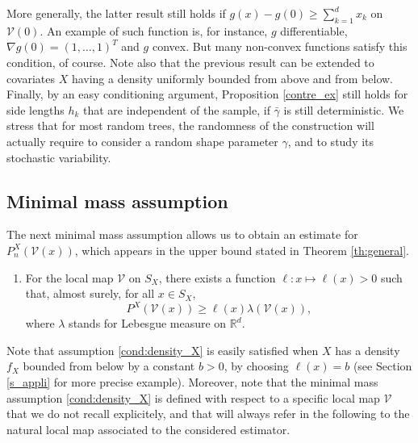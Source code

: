 \documentclass[paper=a4, fontsize=11pt]{scrartcl}
\newcommand{\diam}{\operatorname{diam}}
\begin{document}

More generally, the latter result still holds if $g(x) - g(0) \geq \sum_{k=1}^d x_k$ on $\mathcal V (0)$. An example of such function is, for instance, $g$ differentiable, $\nabla g (0)= (1,\dots,1)^T$ and $g$ convex. But many non-convex functions satisfy this condition, of course. Note also that the previous result can be extended to covariates $X$ having a density uniformly bounded from above and from below. Finally, by an easy conditioning argument, Proposition \ref{contre_ex}
still holds for side lengths $h_k$ that are independent of the sample, if $\bar \gamma$ is still deterministic. We stress that for most random trees, the randomness of the construction will actually require to consider a random shape parameter $\gamma$, and to study its stochastic variability.


\subsection{Minimal mass assumption}\label{4.1}

The next minimal mass assumption allows us to obtain an estimate for $P_n^X(\mathcal V(x)) $, which appears in the upper bound stated in Theorem \ref{th:general}.


\begin{enumerate}[label=(X), wide=0.5em,  leftmargin=*]
\item  \label{cond:density_X} 
For the local map $\mathcal V$ on $S_X$, there exists a function $\ell : x \mapsto \ell(x)> 0$ such that, almost surely, for all $x\in S_X$, 
$$ P^X(\mathcal V(x) )  \geq  \ell(x) \lambda (\mathcal V(x)  )  ,$$
where $\lambda$ stands for Lebesgue measure on $\mathbb R^d$.
\setcounter{nameOfYourChoice}{\value{enumi}}
\end{enumerate}

Note that assumption \ref{cond:density_X} is easily satisfied when $X$ has a density $f_X$ bounded from below by a constant $b > 0$, by choosing $\ell(x) = b$ (see Section \ref{s_appli} for more precise example).
Moreover, note that the minimal mass assumption \ref{cond:density_X} is defined with respect to a specific local map $\mathcal{V}$ that we do not recall explicitely, and that will always refer in the following to the natural local map associated to the considered estimator. 
\end{document}
